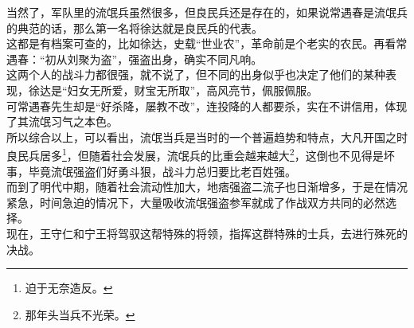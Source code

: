 \begin{multicols}{\theparacolNo}
当然了，军队里的流氓兵虽然很多，但良民兵还是存在的，如果说常遇春是流氓兵的典范的话，那么第一名将徐达就是良民兵的代表。\\

这都是有档案可查的，比如徐达，史载“世业农”，革命前是个老实的农民。再看常遇春：“初从刘聚为盗”，强盗出身，确实不同凡响。\\

这两个人的战斗力都很强，就不说了，但不同的出身似乎也决定了他们的某种表现，徐达是“妇女无所爱，财宝无所取”，高风亮节，佩服佩服。\\

可常遇春先生却是“好杀降，屡教不改”，连投降的人都要杀，实在不讲信用，体现了其流氓习气之本色。\\

所以综合以上，可以看出，流氓当兵是当时的一个普遍趋势和特点，大凡开国之时良民兵居多\footnote{迫于无奈造反。}，但随着社会发展，流氓兵的比重会越来越大\footnote{那年头当兵不光荣。}，这倒也不见得是坏事，毕竟流氓强盗们好勇斗狠，战斗力总归要比老百姓强。\\

而到了明代中期，随着社会流动性加大，地痞强盗二流子也日渐增多，于是在情况紧急，时间急迫的情况下，大量吸收流氓强盗参军就成了作战双方共同的必然选择。\\

现在，王守仁和宁王将驾驭这帮特殊的将领，指挥这群特殊的士兵，去进行殊死的决战。\\
\ifnum{}
	\end{multicols}
\fi
\newpage
